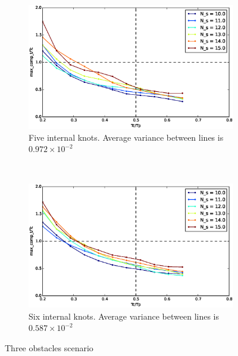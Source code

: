 \begin{figure}[!h]
        ~ %
        \begin{subfigure}[b]{0.48\textwidth}
                \includegraphics[width=\textwidth]{./images/realtime/Scenario_3__N_knots_5/mcttc-tctp.eps}
                \caption{Five internal knots. Average variance between lines is $0.972\times 10^{-2}$}\label{fig:uni35}
        \end{subfigure}
        ~ %
        \begin{subfigure}[b]{0.48\textwidth}
                \includegraphics[width=\textwidth]{./images/realtime/Scenario_3__N_knots_6/mcttc-tctp.eps}
                \caption{Six internal knots. Average variance between lines is $0.587\times 10^{-2}$}\label{fig:uni36}
        \end{subfigure}
        \caption{Three obstacles scenario}\label{fig:uni3}
\end{figure}


